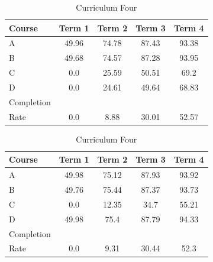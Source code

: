 \documentclass[botnum, fleqn]{unmeethesis}
\begin{document}
\begin{table}[!h]
      \vspace*{1cm}
      \begin{subtable}{0.45\linewidth}
        \centering
          \caption{Curriculum Three}
          \label{tab:simple91}
          \begin{tabular}{l*{4}{c}}
            Course  & Term 1 & Term 2 & Term 3 & Term 4 \\
            \hline
            A & 49.96 & 74.78 & 87.43 & 93.38 \\
            B & 49.68 & 74.57 & 87.28 & 93.95 \\
            C & 0.0   & 25.59 & 50.51 & 69.2  \\
            D & 0.0   & 24.61 & 49.64 & 68.83 \\
            \hline
            Completion \\ Rate & 0.0   & 8.88  & 30.01 & 52.57 \\
          \end{tabular}
      \end{subtable} 
      \hfill
      \begin{subtable}{0.45\linewidth}
        \centering
          \caption{Curriculum Four}
          \label{tab:simple92}
          \begin{tabular}{l*{4}{c}}
            Course  & Term 1 & Term 2 & Term 3 & Term 4 \\
            \hline
            A & 49.98 & 75.12 & 87.93 & 93.92 \\
            B & 49.76 & 75.44 & 87.37 & 93.73 \\
            C & 0.0   & 12.35 & 34.7  & 55.21 \\
            D & 49.98 & 75.4  & 87.79 & 94.33 \\
            \hline
            Completion \\ Rate & 0.0   & 9.31  & 30.44 & 52.3  \\
          \end{tabular}
      \end{subtable}


\end{table}
\end{document}
